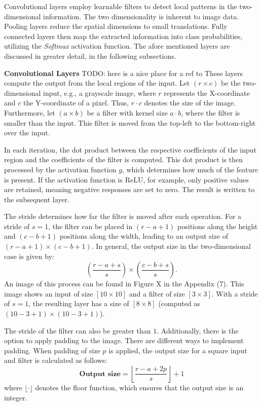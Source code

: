 Convolutional layers employ learnable filters to detect local patterns in the two-dimensional information. The two dimensionality is inherent to image data. Pooling layers reduce the spatial dimensions to small translations. Fully connected layers then map the extracted information into class probabilities, utilizing the \textit{Softmax} activation function. The afore mentioned layers are discussed in greater detail, in the following subsections.

\vspace{1em}

\textbf{Convolutional Layers}\label{theoretical_classification_conv_layers}
TODO: here is a nice place for a ref to \cite{Dumoulin2016TransposedConv}
These layers compute the output from the local regions of the input. Let $(r \times c)$ be the two-dimensional input, e.g., a grayscale image, where $r$ represents the X-coordinate and $c$ the Y-coordinate of a pixel. Thus, $r \cdot c$ denotes the size of the image. Furthermore, let $(a \times b)$ be a filter with kernel size $a \cdot b$, where the filter is smaller than the input. This filter is moved from the top-left to the bottom-right over the input.

In each iteration, the dot product between the respective coefficients of the input region and the coefficients of the filter is computed. This dot product is then processed by the activation function $g$, which determines how much of the feature is present. If the activation function is ReLU, for example, only positive values are retained, meaning negative responses are set to zero. The result is written to the subsequent layer.

The stride determines how far the filter is moved after each operation. For a stride of $s = 1$, the filter can be placed in $(r - a + 1)$ positions along the height and $(c - b + 1)$ positions along the width, leading to an output size of $(r - a + 1) \times (c - b + 1)$. In general, the output size in the two-dimensional case is given by:
\[
\left( \frac{r - a + s}{s} \right) \times \left( \frac{c - b + s}{s} \right).
\]
An image of this process can be found in Figure X in the Appendix (7). This image shows an input of size $[10 \times 10]$ and a filter of size $[3 \times 3]$. With a stride of $s = 1$, the resulting layer has a size of $[8 \times 8]$ (computed as $\left(10 - 3 + 1\right) \times \left(10 - 3 + 1\right)$).

The stride of the filter can also be greater than $1$. Additionally, there is the option to apply padding to the image. There are different ways to implement padding. When padding of size $p$ is applied, the output size for a square input and filter is calculated as follows:
\[
\textbf{Output size} = \left\lfloor \frac{r - a + 2p}{s} \right\rfloor + 1
\]
where $\lfloor \cdot \rfloor$ denotes the floor function, which ensures that the output size is an integer.


